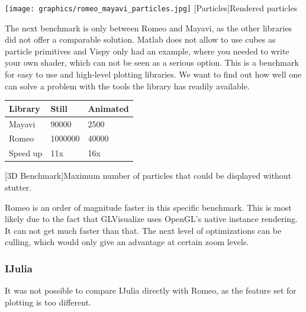 \begin{minipage}{\linewidth}
    \centering
    \texttt{[image: graphics/romeo\_mayavi\_particles.jpg]}
    [Particles]{Rendered particles}
    \label{fig:reactive1}
\end{minipage}

The next benchmark is only between Romeo and Mayavi, as the other libraries did not offer a comparable solution. Matlab does not allow to use cubes as particle primitives and Vispy only had an example, where you needed to write your own shader, which can not be seen as a serious option. This is a benchmark for easy to use and high-level plotting libraries. We want to find out how well one can solve a problem with the tools the library has readily available.

\begin{table}[htbp]
    \centering
    \begin{tabular}{l|l|l}
        \hline
        \textbf{Library} & \textbf{Still}  & \textbf{Animated}  \\ 
        \hline
        Mayavi           & 90000           & 2500  \\
        Romeo            & 1000000         & 40000 \\
        \hline
        \hline
        Speed up         & 11x             & 16x \\
    \end{tabular}
    [3D Benchmark]{Maximum number of particles that could be displayed without stutter.}
    \label{table:relativespeedoglw}
\end{table}

Romeo is an order of magnitude faster in this specific benchmark. This is most likely due to the fact that GLVisualize uses OpenGL's native instance rendering.
It can not get much faster than that. The next level of optimizations can be culling, which would only give an advantage at certain zoom levels.

\subsubsection{IJulia}

It was not possible to compare IJulia directly with Romeo, as the feature set for plotting is too different.


